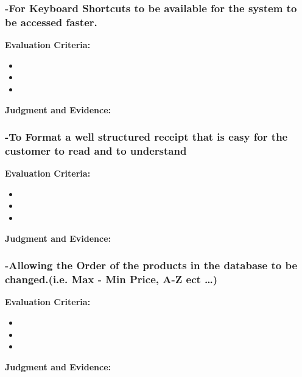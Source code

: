 \subsubsection{-For Keyboard Shortcuts to be available for the system to be accessed faster.}
\textbf{Evaluation Criteria:} \newline
\begin{itemize}
\item{}
\item{}
\item{}
\end{itemize}

\textbf{Judgment and Evidence:} \newline








\subsubsection{-To Format a well structured receipt that is easy for the customer to read and to understand}
\textbf{Evaluation Criteria:} \newline
\begin{itemize}
\item{}
\item{}
\item{}
\end{itemize}

\textbf{Judgment and Evidence:} \newline







\subsubsection{-Allowing the Order of the products in the database to be changed.(i.e. Max - Min Price, A-Z ect \ldots)}\textbf{Evaluation Criteria:} \newline
\begin{itemize}
\item{}
\item{}
\item{}
\end{itemize}

\textbf{Judgment and Evidence:} \newline









